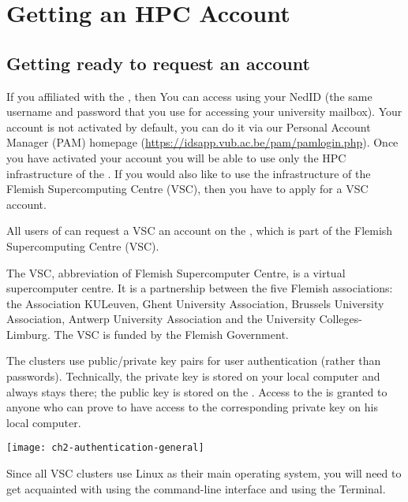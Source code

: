 \chapter{Getting an HPC Account}
\label{ch:getting-a-hpc-account}

\section{Getting ready to request an account}
\label{sec:getting-ready-to-request-an-account}

\ifbrussel
 If you affiliated with the \university, then You can access \hpc using your NedID
 (the same username and password that you use for accessing your university mailbox).
 Your \hpc account is not activated by default, you can do it via our Personal
 Account Manager (PAM) homepage (\url{https://idsapp.vub.ac.be/pam/pamlogin.php}).
 Once you have activated your \hpcname account you will be able to use only the HPC
 infrastructure of the \university. If you would also like to use the infrastructure of
 the Flemish Supercomputing Centre (VSC), then you have to apply for a VSC account.
\fi

All users of \association can request
\ifbrussel
 a VSC
 \else
 an
\fi
account on
the \hpc, which is part of the Flemish Supercomputing Centre (VSC).

The VSC, abbreviation of Flemish Supercomputer Centre, is a virtual
supercomputer centre. It is a partnership between the five Flemish
associations: the Association KULeuven,  Ghent University Association, Brussels
University Association, Antwerp University Association and the University
Colleges-Limburg. The VSC is funded by the Flemish Government.

The \hpc clusters use public/private key pairs for user authentication
(rather than passwords). Technically, the private key is stored on your local
computer and always stays there; the public key is stored on the \hpc.
Access to the \hpc is granted to anyone who can prove to have access to the
corresponding private key on his local computer.

\begin{center}
\texttt{[image: ch2-authentication-general]}
\end{center}

Since all VSC clusters use Linux as their main operating system, you will
need to get acquainted with using the command-line interface and using the
Terminal.

